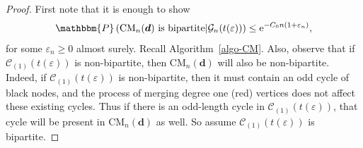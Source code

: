 \documentclass[11pt,a4paper, reqno]{article}
\numberwithin{equation}{section}
\numberwithin{equation}{section}
\def\sss{\scriptscriptstyle}
\newcommand{\prob}[1]{\ensuremath{\mathbbm{P}\left(#1\right)}}
\newcommand{\e}{\ensuremath{\mathrm{e}}}
\newcommand{\1}{\ensuremath{\mathbbm{1}}}
\newcommand{\CM}{\ensuremath{\mathrm{CM}_n(\boldsymbol{d})}}
\newcommand{\sCL}{\mathscr{C}_{\sss (1)}}
\numberwithin{equation}{section}
\numberwithin{theorem}{section}
\begin{document}
\begin{proof}
First note that it is enough to show 
\begin{equation}\label{eq:prob-bip-exp-2}
\prob{\CM \text{ is bipartite} \vert \mathcal{G}_n(t(\varepsilon))}\leq \e^{-C_0 n(1+\varepsilon_n)},
\end{equation}
for some $\varepsilon_n \geq 0$ almost surely.
Recall Algorithm~\ref{algo-CM}.
Also, observe that if $\sCL(t(\varepsilon))$ is non-bipartite, then $\CM$ will also be non-bipartite. 
Indeed, if $\sCL(t(\varepsilon))$ is non-bipartite, then it must contain an odd cycle of black nodes, and the process of merging degree one (red) vertices does not affect these existing cycles. 
Thus if there is an odd-length cycle in $\sCL(t(\varepsilon))$, that cycle will be present in $\CM$ as well. 
So assume $\sCL(t(\varepsilon))$ is bipartite.


\end{proof}
\end{document}
